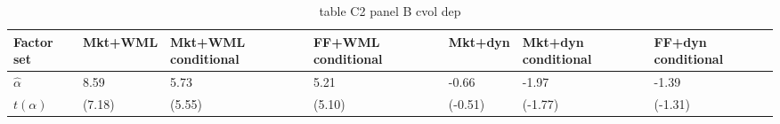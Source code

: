 \begin{table}[htbp]
  \centering
  \caption{table C2 panel B cvol dep}
  \label{tab:table_C2_panel_B_cvol_dep}
  \begin{tabular}{lllllll}
\toprule
Factor set & Mkt+WML & Mkt+WML conditional & FF+WML conditional & Mkt+dyn & Mkt+dyn conditional & FF+dyn conditional \\
\midrule
$\hat{\alpha}$ & 8.59 & 5.73 & 5.21 & -0.66 & -1.97 & -1.39 \\
$t(\alpha)$ & (7.18) & (5.55) & (5.10) & (-0.51) & (-1.77) & (-1.31) \\
\bottomrule
\end{tabular}

\end{table}
